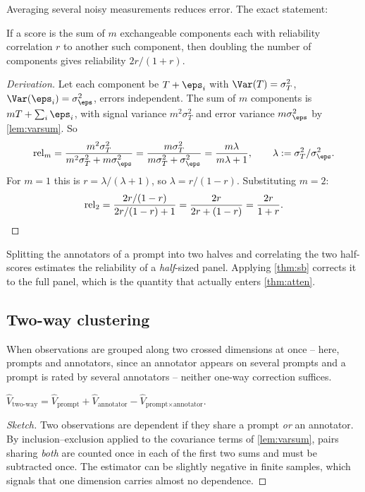 Averaging several noisy measurements reduces error. The exact statement:

\begin{theorem}
\label{thm:sb}
If a score is the sum of $m$ exchangeable components each with reliability
correlation $r$ to another such component, then doubling the number of components
gives reliability $2r/(1+r)$.
\end{theorem}
\begin{proof}[Derivation]
Let each component be $T + \eps_i$ with $\Var(T)=\sigma_T^2$,
$\Var(\eps_i)=\sigma_\eps^2$, errors independent. The sum of $m$ components is
$mT + \sum_i \eps_i$, with signal variance $m^2\sigma_T^2$ and error variance
$m\sigma_\eps^2$ by \cref{lem:varsum}. So
\[
\mathrm{rel}_m = \frac{m^2\sigma_T^2}{m^2\sigma_T^2+m\sigma_\eps^2}
= \frac{m\sigma_T^2}{m\sigma_T^2+\sigma_\eps^2}
= \frac{m\lambda}{m\lambda+1},\qquad \lambda := \sigma_T^2/\sigma_\eps^2 .
\]
For $m=1$ this is $r = \lambda/(\lambda+1)$, so $\lambda = r/(1-r)$. Substituting
$m=2$:
\[
\mathrm{rel}_2 = \frac{2r/(1-r)}{2r/(1-r)+1} = \frac{2r}{2r+(1-r)} = \frac{2r}{1+r}. \qedhere
\]
\end{proof}

\begin{remark}
Splitting the annotators of a prompt into two halves and correlating the two
half-scores estimates the reliability of a \emph{half}-sized panel. Applying
\cref{thm:sb} corrects it to the full panel, which is the quantity that actually
enters \cref{thm:atten}.
\end{remark}

\subsection{Two-way clustering}

When observations are grouped along two crossed dimensions at once -- here,
prompts and annotators, since an annotator appears on several prompts and a
prompt is rated by several annotators -- neither one-way correction suffices.

\begin{theorem}
\label{thm:cgm}
$\hat V_{\text{two-way}} = \hat V_{\text{prompt}} + \hat V_{\text{annotator}}
 - \hat V_{\text{prompt}\times\text{annotator}}$.
\end{theorem}
\begin{proof}[Sketch]
Two observations are dependent if they share a prompt \emph{or} an annotator. By
inclusion--exclusion applied to the covariance terms of \cref{lem:varsum}, pairs
sharing \emph{both} are counted once in each of the first two sums and must be
subtracted once. The estimator can be slightly negative in finite samples, which
signals that one dimension carries almost no dependence.
\end{proof}

